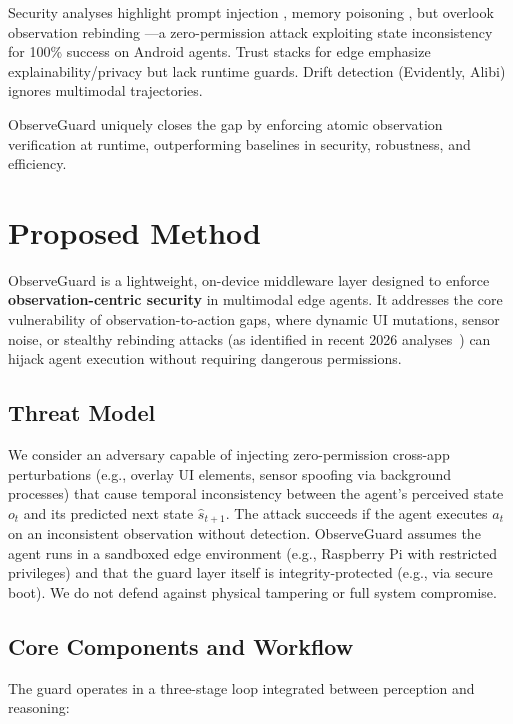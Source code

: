 Security analyses highlight prompt injection \cite{owasp2025}, memory poisoning \cite{raza2026trism}, but overlook observation rebinding \cite{qian2026rebinding}—a zero-permission attack exploiting state inconsistency for 100\% success on Android agents. Trust stacks for edge \cite{wevolver2026} emphasize explainability/privacy but lack runtime guards. Drift detection (Evidently, Alibi) ignores multimodal trajectories.

ObserveGuard uniquely closes the gap by enforcing atomic observation verification at runtime, outperforming baselines in security, robustness, and efficiency.

\section{Proposed Method}
ObserveGuard is a lightweight, on-device middleware layer designed to enforce \textbf{observation-centric security} in multimodal edge agents. It addresses the core vulnerability of observation-to-action gaps, where dynamic UI mutations, sensor noise, or stealthy rebinding attacks (as identified in recent 2026 analyses~\cite{qian2026rebinding,worldgui2026}) can hijack agent execution without requiring dangerous permissions.

\subsection{Threat Model}
We consider an adversary capable of injecting zero-permission cross-app perturbations (e.g., overlay UI elements, sensor spoofing via background processes) that cause temporal inconsistency between the agent's perceived state $o_t$ and its predicted next state $\hat{s}_{t+1}$. The attack succeeds if the agent executes $a_t$ on an inconsistent observation without detection. ObserveGuard assumes the agent runs in a sandboxed edge environment (e.g., Raspberry Pi with restricted privileges) and that the guard layer itself is integrity-protected (e.g., via secure boot). We do not defend against physical tampering or full system compromise.

\subsection{Core Components and Workflow}
The guard operates in a three-stage loop integrated between perception and reasoning:

